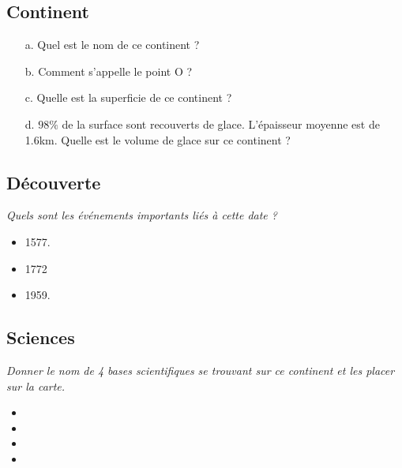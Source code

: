 \documentclass[10pt,landscape]{article}
\newcommand{\Pointille}[1][3]{\multido{}{#1}{ \makebox[\linewidth]{\dotfill}\\[\parskip]}}
\begin{document}
\begin{multicols}{2}
\begin{multicols}{2}
  \end{multicols}

  \subsection*{Continent}
  
  \begin{enumerate}
  \item[a.] Quel est le nom de ce continent ?\\
    \Pointille[1]
  \item[b.] Comment s'appelle le point O ?\\
    \Pointille[1] 
  \item[c.] Quelle est la superficie de ce continent ?\\
    \Pointille[1]
  \item[d.] $98\%$ de la surface sont recouverts de glace. L'épaisseur moyenne est de 1.6km. Quelle est le volume de glace sur ce continent ?\\
    \Pointille[4]
  \end{enumerate}

  \subsection*{Découverte}
  
  \textit{Quels sont les événements importants liés à cette date ?}
  \begin{itemize}
  \item 1577.\\
    \Pointille[1]
  \item 1772 \\
    \Pointille[1]
  \item 1959. \\
    \Pointille[1]
  \end{itemize}

  \begin{multicols}{2}
    \subsection*{Sciences}
    \textit{Donner le nom de 4 bases scientifiques se trouvant sur ce continent et les placer sur la carte.}
    \begin{itemize}
    \item \Pointille[1]
    \item \Pointille[1]
    \item \Pointille[1]
    \item \Pointille[1]
    \end{itemize}
  \end{multicols}

\end{multicols}
\end{document}
